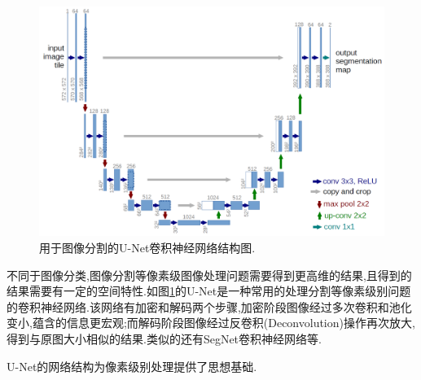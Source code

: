 \begin{figure}[htbp!]
    \centering
    \includegraphics[width = 1.\textwidth]{chap/img/u-net-architecture.png}
    \caption{
        用于图像分割的U-Net\supercite{ronneberger2015u}卷积神经网络结构图.
        }\label{fig:unet_architecture}
\end{figure}
\par
不同于图像分类,图像分割等像素级图像处理问题需要得到更高维的结果,且得到的结果需要有一定的空间特性.如图\ref{fig:unet_architecture}的U-Net是一种常用的处理分割等像素级别问题的卷积神经网络.该网络有加密和解码两个步骤,加密阶段图像经过多次卷积和池化变小,蕴含的信息更宏观;而解码阶段图像经过反卷积(Deconvolution)操作再次放大,得到与原图大小相似的结果.类似的还有SegNet\supercite{badrinarayanan2017segnet}卷积神经网络等.
\par
U-Net的网络结构为像素级别处理提供了思想基础.
\par

